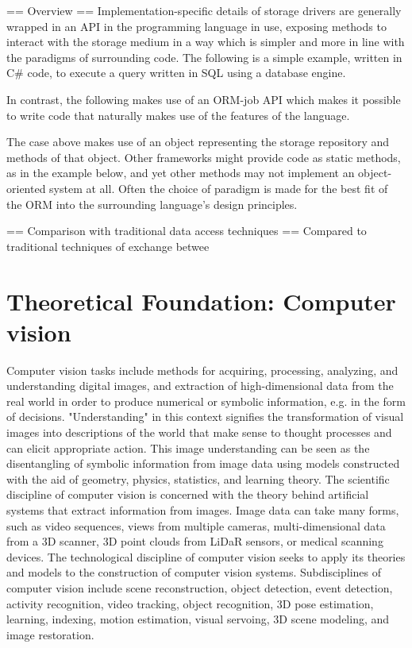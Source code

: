 \documentclass[12pt,a4paper]{report}
\begin{document}
== Overview ==
Implementation-specific details of storage drivers are generally wrapped in an API in the programming language in use, exposing methods to interact with the storage medium in a way which is simpler and more in line with the paradigms of surrounding code.
The following is a simple example, written in C\# code, to execute a query written in SQL using a database engine.

In contrast, the following makes use of an ORM-job API which makes it possible to write code that naturally makes use of the features of the language.

The case above makes use of an object representing the storage repository and methods of that object. Other frameworks might provide code as static methods, as in the example below, and yet other methods may not implement an object-oriented system at all. Often the choice of paradigm is made for the best fit of the ORM into the surrounding language's design principles.


== Comparison with traditional data access techniques ==
Compared to traditional techniques of exchange betwee

\section{Theoretical Foundation: Computer vision}
Computer vision tasks include methods for acquiring, processing, analyzing, and understanding digital images, and extraction of high-dimensional data from the real world in order to produce numerical or symbolic information, e.g. in the form of decisions. "Understanding" in this context signifies the transformation of visual images into descriptions of the world that make sense to thought processes and can elicit appropriate action. This image understanding can be seen as the disentangling of symbolic information from image data using models constructed with the aid of geometry, physics, statistics, and learning theory.
The scientific discipline of computer vision is concerned with the theory behind artificial systems that extract information from images. Image data can take many forms, such as video sequences, views from multiple cameras, multi-dimensional data from a 3D scanner, 3D point clouds from LiDaR sensors, or medical scanning devices. The technological discipline of computer vision seeks to apply its theories and models to the construction of computer vision systems.
Subdisciplines of computer vision include scene reconstruction, object detection, event detection, activity recognition, video tracking, object recognition, 3D pose estimation, learning, indexing, motion estimation, visual servoing, 3D scene modeling, and image restoration.
\end{document}
